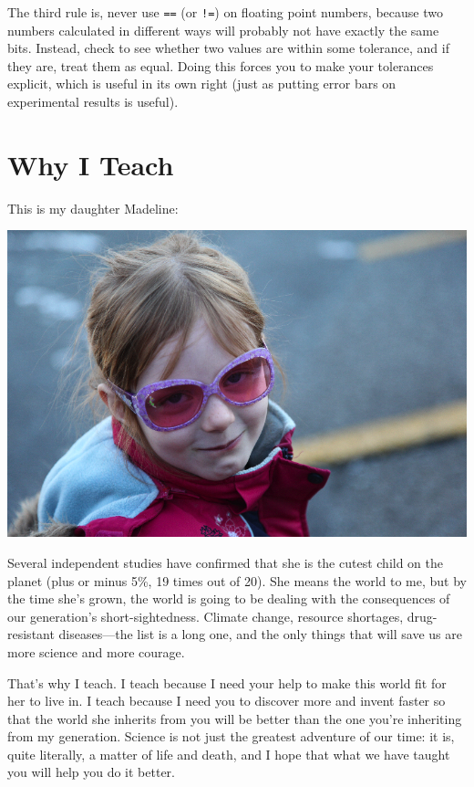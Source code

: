 \documentclass{book}
\begin{document}
The third rule is, never use \texttt{==} (or \texttt{!=}) on floating
point numbers, because two numbers calculated in different ways will
probably not have exactly the same bits. Instead, check to see whether
two values are within some tolerance, and if they are, treat them as
equal. Doing this forces you to make your tolerances explicit, which is
useful in its own right (just as putting error bars on experimental
results is useful).

\section{Why I Teach}

This is my daughter Madeline:

\includegraphics{novice/extras/img/madeleine.jpg}

Several independent studies have confirmed that she is the cutest child
on the planet (plus or minus 5\%, 19 times out of 20). She means the
world to me, but by the time she's grown, the world is going to be
dealing with the consequences of our generation's short-sightedness.
Climate change, resource shortages, drug-resistant diseases---the list
is a long one, and the only things that will save us are more science
and more courage.

That's why I teach. I teach because I need your help to make this world
fit for her to live in. I teach because I need you to discover more and
invent faster so that the world she inherits from you will be better
than the one you're inheriting from my generation. Science is not just
the greatest adventure of our time: it is, quite literally, a matter of
life and death, and I hope that what we have taught you will help you do
it better.
\end{document}
